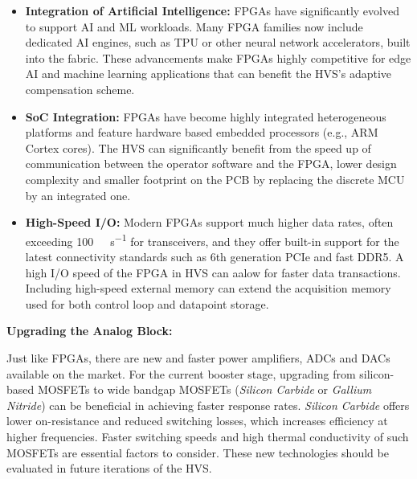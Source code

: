 \begin{itemize}[topsep=8pt,itemsep=4pt,partopsep=4pt, parsep=4pt]
    \item \textbf{Integration of Artificial Intelligence:}
    FPGAs have significantly evolved to support \ac{AI} and \ac{ML} workloads.
    Many FPGA families now include dedicated AI engines, such as \ac{TPU} or
    other neural network accelerators, built into the fabric.
    These advancements make FPGAs highly competitive for edge AI and machine
    learning applications that can benefit the \acs{HVS}'s adaptive
    compensation scheme.

    \item \textbf{SoC Integration:}
    FPGAs have become highly integrated heterogeneous platforms and feature
    hardware based embedded processors (e.g., ARM Cortex cores).
    The \acs{HVS} can significantly benefit from the speed up of
    communication between the operator software and the FPGA,
    lower design complexity and smaller footprint on the \ac{PCB}
    by replacing the discrete \acs{MCU} by an integrated one.

    \item \textbf{High-Speed \acs{I/O}:}
    Modern \acs{FPGA}s support much higher data rates, often exceeding
    \SI{100}{\giga\bit\per\second} for transceivers, and they offer built-in
    support for the latest connectivity standards such as 6th generation
    \acs{PCIe} and fast \acs{DDR}5.
    A high \ac{I/O} speed of the \acs{FPGA} in \acs{HVS} can aalow for faster
    data transactions.
    Including high-speed external memory can extend the acquisition memory
    used for both control loop and datapoint storage.

\end{itemize}

\pagebreak
\noindent\textbf{Upgrading the Analog Block:}

Just like \acs{FPGA}s, there are new and faster power amplifiers,
\acs{ADC}s and \acs{DAC}s available on the market.
For the current booster stage, upgrading from silicon-based \acs{MOSFET}s to
wide bandgap \acs{MOSFET}s (\emph{Silicon Carbide} or \emph{Gallium Nitride})
can be beneficial in achieving faster response rates.
\emph{Silicon Carbide} offers lower on-resistance
and reduced switching losses, which increases efficiency at higher frequencies.
Faster switching speeds and high thermal conductivity of such \acs{MOSFET}s
are essential factors to consider.
These new technologies should be evaluated in future iterations of the
\acs{HVS}.

